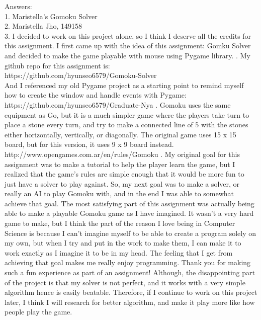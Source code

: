 \documentclass[a4paper]{article}
\begin{document}
\noindent Answers:\\
1.	Maristella’s Gomoku Solver\\
2.	Maristella Jho, 149158\\
3.	I decided to work on this project alone, so I think I deserve all the credits for this assignment. I first came up with the idea of this assignment: Gomku Solver and decided to make the game playable with mouse using Pygame library.
.	My github repo for this assignment is: \\
https://github.com/hyunseo6579/Gomoku-Solver\\
And I referenced my old Pygame project as a starting point to remind myself how to create the window and handle events with Pygame:\\https://github.com/hyunseo6579/Graduate-Nya
.	Gomoku uses the same equipment as Go, but it is a much simpler game where the players take turn to place a stone every turn, and try to make a connected line of 5 with the stones either horizontally, vertically, or diagonally. The original game uses 15 x 15 board, but for this version, it uses 9 x 9 board instead.
http://www.opengames.com.ar/en/rules/Gomoku
.	My original goal for this assignment was to make a tutorial to help the player learn the game, but I realized that the game’s rules are simple enough that it would be more fun to just have a solver to play against. So, my next goal was to make a solver, or really an AI to play Gomoku with, and in the end I was able to somewhat achieve that goal. The most satisfying part of this assignment was actually being able to make a playable Gomoku game as I have imagined. It wasn’t a very hard game to make, but I think the part of the reason I love being in Computer Science is because I can’t imagine myself to be able to create a program solely on my own, but when I try and put in the work to make them, I can make it to work exactly as I imagine it to be in my head. The feeling that I get from achieving that goal makes me really enjoy programming. Thank you for making such a fun experience as part of an assignment! Although, the disappointing part of the project is that my solver is not perfect, and it works with a very simple algorithm hence is easily beatable. Therefore, if I continue to work on this project later, I think I will research for better algorithm, and make it play more like how people play the game.
\newline
\end{document}
